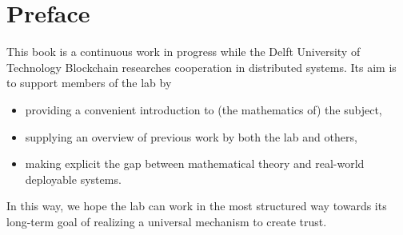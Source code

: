 \chapter{Preface}
This book is a continuous work in progress while the Delft University of Technology Blockchain researches cooperation in distributed systems. Its aim is to support members of the lab by
\begin{itemize}
	\item 
	providing a convenient introduction to (the mathematics of) the subject,
	\item
	supplying an overview of previous work by both the lab and others,
	\item
	making explicit the gap between mathematical theory and real-world deployable systems.
\end{itemize}
In this way, we hope the lab can work in the most structured way towards its long-term goal of realizing a universal mechanism to create trust. 